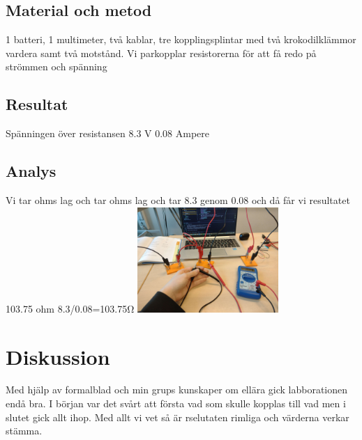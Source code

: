 \documentclass[11p]{article}
\begin{document}
    \subsection{Material och metod}
    1 batteri, 1 multimeter, två kablar, tre kopplingsplintar med två krokodilklämmor vardera samt två motstånd.
    Vi parkopplar resistorerna för att få redo på strömmen och spänning
    \subsection{Resultat}
    Spänningen över resistansen 8.3 V
    0.08 Ampere
    \subsection{Analys}
    Vi tar ohms lag och tar ohms lag och tar 8.3 genom 0.08 och då får vi resultatet 103.75 ohm
    8.3/0.08=103.75Ω
    \includegraphics[width=0.4\textwidth]{../images/labb3.jpg}
    \section{Diskussion}
    Med hjälp av formalblad och min grups kunskaper om ellära gick labborationen endå bra. I början var det svårt att första vad som skulle kopplas till vad men i slutet gick allt ihop. Med allt vi vet så är rselutaten rimliga och värderna verkar stämma.
\end{document}
